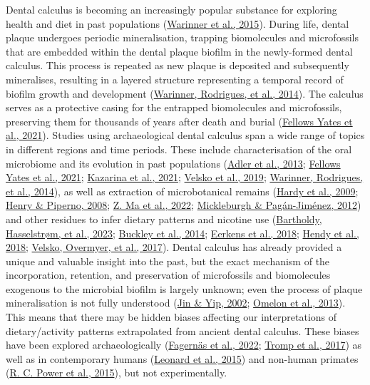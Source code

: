 \documentclass[
  letterpaper,
]{book}
\begin{document}
Dental calculus is becoming an increasingly popular substance for
exploring health and diet in past populations
(\protect\hyperlink{ref-warinnerNewEra2015}{Warinner et al., 2015}).
During life, dental plaque undergoes periodic mineralisation, trapping
biomolecules and microfossils that are embedded within the dental plaque
biofilm in the newly-formed dental calculus. This process is repeated as
new plaque is deposited and subsequently mineralises, resulting in a
layered structure representing a temporal record of biofilm growth and
development (\protect\hyperlink{ref-warinnerPathogensHost2014}{Warinner,
Rodrigues, et al., 2014}). The calculus serves as a protective casing
for the entrapped biomolecules and microfossils, preserving them for
thousands of years after death and burial
(\protect\hyperlink{ref-yatesOralMicrobiome2021}{Fellows Yates et al.,
2021}). Studies using archaeological dental calculus span a wide range
of topics in different regions and time periods. These include
characterisation of the oral microbiome and its evolution in past
populations (\protect\hyperlink{ref-adlerSequencingAncient2013}{Adler et
al., 2013}; \protect\hyperlink{ref-yatesOralMicrobiome2021}{Fellows
Yates et al., 2021};
\protect\hyperlink{ref-kazarinaPostmedievalMicrobial2021}{Kazarina et
al., 2021};
\protect\hyperlink{ref-velskoMicrobialDifferences2019}{Velsko et al.,
2019}; \protect\hyperlink{ref-warinnerPathogensHost2014}{Warinner,
Rodrigues, et al., 2014}), as well as extraction of microbotanical
remains (\protect\hyperlink{ref-hardyStarchGranules2009}{Hardy et al.,
2009}; \protect\hyperlink{ref-henryCalculusSyria2008}{Henry \& Piperno,
2008}; \protect\hyperlink{ref-maHumanDiet2022}{Z. Ma et al., 2022};
\protect\hyperlink{ref-mickleburghNewInsights2012}{Mickleburgh \&
Pagán-Jiménez, 2012}) and other residues to infer dietary patterns and
nicotine use
(\protect\hyperlink{ref-bartholdyMultiproxyAnalysis2023}{Bartholdy,
Hasselstrøm, et al., 2023};
\protect\hyperlink{ref-buckleyDentalCalculus2014}{Buckley et al., 2014};
\protect\hyperlink{ref-eerkensDentalCalculus2018}{Eerkens et al., 2018};
\protect\hyperlink{ref-hendyProteomicCalculus2018}{Hendy et al., 2018};
\protect\hyperlink{ref-velskoDentalCalculus2017}{Velsko, Overmyer, et
al., 2017}). Dental calculus has already provided a unique and valuable
insight into the past, but the exact mechanism of the incorporation,
retention, and preservation of microfossils and biomolecules exogenous
to the microbial biofilm is largely unknown; even the process of plaque
mineralisation is not fully understood
(\protect\hyperlink{ref-jinSupragingivalCalculus2002}{Jin \& Yip, 2002};
\protect\hyperlink{ref-omelonReviewPhosphate2013}{Omelon et al., 2013}).
This means that there may be hidden biases affecting our interpretations
of dietary/activity patterns extrapolated from ancient dental calculus.
These biases have been explored archaeologically
(\protect\hyperlink{ref-fagernasMicrobialBiogeography2022}{Fagernäs et
al., 2022}; \protect\hyperlink{ref-trompEDTACalculus2017}{Tromp et al.,
2017}) as well as in contemporary humans
(\protect\hyperlink{ref-leonardPlantMicroremains2015}{Leonard et al.,
2015}) and non-human primates
(\protect\hyperlink{ref-powerChimpCalculus2015}{R. C. Power et al.,
2015}), but not experimentally.
\end{document}

